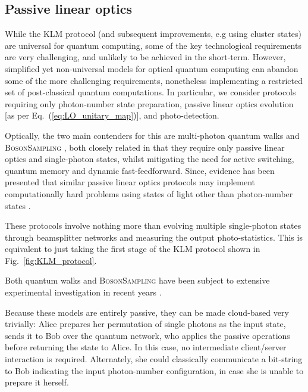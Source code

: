 %
%

\subsection{Passive linear optics} \label{sec:passive_LO} 

While the KLM protocol (and subsequent improvements, e.g using cluster states) are universal for quantum computing, some of the key technological requirements are very challenging, and unlikely to be achieved in the short-term. However, simplified yet non-universal models for optical quantum computing can abandon some of the more challenging requirements, nonetheless implementing a restricted set of post-classical quantum computations. In particular, we consider protocols requiring only photon-number state preparation, passive linear optics evolution [as per Eq.~(\ref{eq:LO_unitary_map})], and photo-detection.

Optically, the two main contenders for this are multi-photon quantum walks \cite{bib:Aharonov93, bib:Aharonov01, bib:Kempe03, bib:Childs09, bib:Salvador12, bib:RohdeMultiWalk11} and \textsc{BosonSampling} \cite{bib:AaronsonArkhipov10, bib:RohdeIntroBS15}, both closely related in that they require only passive linear optics and single-photon states, whilst mitigating the need for active switching, quantum memory and dynamic fast-feedforward. Since, evidence has been presented that similar passive linear optics protocols may implement computationally hard problems using states of light other than photon-number states \cite{bib:RandBS, bib:RohdePhotAdd15, bib:RohdeDisp15, bib:RohdeCat15}.

These protocols involve nothing more than evolving multiple single-photon states through beamsplitter networks and measuring the output photo-statistics. This is equivalent to just taking the first stage of the KLM protocol shown in Fig.~\ref{fig:KLM_protocol}.

Both quantum walks and \textsc{BosonSampling} have been subject to extensive experimental investigation in recent years \cite{bib:PeruzzoQW, bib:Broome10, bib:Schreiber11b, bib:Owens11, bib:RohdeQWExp12, bib:Broome2012, bib:RohdeQWExp12, bib:Spring2, bib:Crespi3, bib:Tillmann4}.

Because these models are entirely passive, they can be made cloud-based very trivially: Alice prepares her permutation of single photons as the input state, sends it to Bob over the quantum network, who applies the passive operations before returning the state to Alice. In this case, no intermediate client/server interaction is required. Alternately, she could classically communicate a bit-string to Bob indicating the input photon-number configuration, in case she is unable to prepare it herself.

